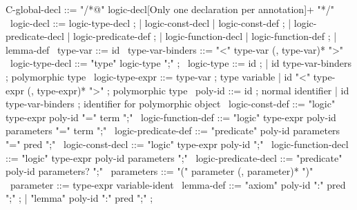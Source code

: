 \begin{syntax}
  C-global-decl ::= "/*@" logic-decl{[Only one declaration per annotation]+} "*/"
  \
  logic-decl ::= logic-type-decl ;
          | logic-const-decl | logic-const-def ;
          | logic-predicate-decl | logic-predicate-def ;
          | logic-function-decl | logic-function-def ;
          | lemma-def
  \
  type-var ::= id
  \
  type-var-binders ::= "<" type-var (, type-var)* ">"
  \
  logic-type-decl ::= "type" logic-type ";" ;
  \
  logic-type ::= id ;
  | id type-var-binders ; polymorphic type
  \
  logic-type-expr ::= type-var ; type variable
  | id "<" type-expr (, type-expr)* ">" ; polymorphic type
  \
  poly-id ::= id ; normal identifier
  | id type-var-binders ; identifier for polymorphic object
  \
  logic-const-def ::= {"logic" type-expr poly-id "=" term ";"}
  \
  logic-function-def ::= "logic" type-expr poly-id parameters "=" term ";"
  \
  logic-predicate-def ::= "predicate" poly-id parameters "=" pred ";"
  \
  logic-const-decl ::= { "logic" type-expr poly-id ";"}
  \
  logic-function-decl ::= "logic" type-expr poly-id parameters ";"
  \
  logic-predicate-decl ::= "predicate" poly-id parameters? ";"
  \
  parameters ::= "(" parameter (, parameter)* ")"
  \
  parameter ::= type-expr variable-ident
  \
  lemma-def ::= "axiom" poly-id ":" pred ";" ;
  | "lemma" poly-id ":" pred ";" ;
\end{syntax}